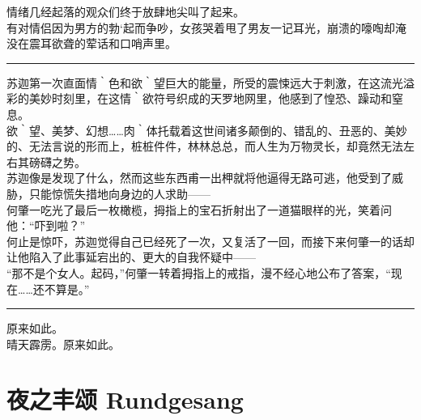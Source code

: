 \documentclass[oneside,11pt]{memoir} %
\begin{document}
\begin{CJK}{UTF8}{gbsn}
    情绪几经起落的观众们终于放肆地尖叫了起来。\\\indent
    有对情侣因为男方的勃`起而争吵，女孩哭着甩了男友一记耳光，崩溃的嚎啕却淹没在震耳欲聋的荤话和口哨声里。\\\indent
\rule{-3pt}{30pt}
    苏迦第一次直面情｀色和欲｀望巨大的能量，所受的震悚远大于刺激，在这流光溢彩的美妙时刻里，在这情｀欲符号织成的天罗地网里，他感到了惶恐、躁动和窒息。\\\indent
    欲｀望、美梦、幻想……肉｀体托载着这世间诸多颠倒的、错乱的、丑恶的、美妙的、无法言说的形而上，桩桩件件，林林总总，而人生为万物灵长，却竟然无法左右其磅礴之势。\\\indent
    苏迦像是发现了什么，然而这些东西甫一出柙就将他逼得无路可逃，他受到了威胁，只能惊慌失措地向身边的人求助——\\\indent
    何肇一吃光了最后一枚橄榄，拇指上的宝石折射出了一道猫眼样的光，笑着问他：“吓到啦？”\\\indent
    何止是惊吓，苏迦觉得自己已经死了一次，又复活了一回，而接下来何肇一的话却让他陷入了此事延宕出的、更大的自我怀疑中——\\\indent
    “那不是个女人。起码，”何肇一转着拇指上的戒指，漫不经心地公布了答案，“现在……还不算是。”\\\indent
\rule{-3pt}{30pt}
    原来如此。\\\indent
    晴天霹雳。原来如此。\\\indent

\newpage
\chapter{夜之丰颂    Rundgesang}
\newpage

\end{CJK}
\end{document}

